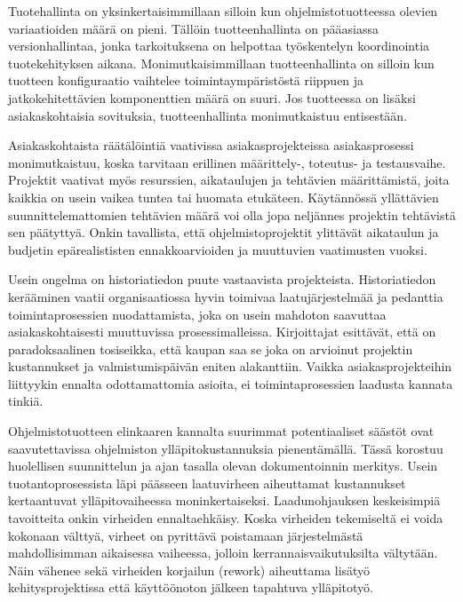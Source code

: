 \documentclass[finnish,12pt,a4paper,pdftex]{article}
\begin{document}
Tuotehallinta on yksinkertaisimmillaan silloin kun ohjelmistotuotteessa olevien variaatioiden määrä on pieni. Tällöin tuotteenhallinta on pääasiassa versionhallintaa, jonka tarkoituksena on helpottaa työskentelyn koordinointia tuotekehityksen aikana. Monimutkaisimmillaan tuotteenhallinta on silloin kun tuotteen konfiguraatio vaihtelee toimintaympäristöstä riippuen ja jatkokehitettävien komponenttien määrä on suuri. Jos tuotteessa on lisäksi asiakaskohtaisia sovituksia, tuotteenhallinta monimutkaistuu entisestään. \citep{okaytannot}

Asiakaskohtaista räätälöintiä vaativissa asiakasprojekteissa asiakasprosessi monimutkaistuu, koska tarvitaan erillinen määrittely-, toteutus- ja testausvaihe. Projektit vaativat myös resurssien, aikataulujen ja tehtävien määrittämistä, joita kaikkia on usein vaikea tuntea tai huomata etukäteen. Käytännössä yllättävien suunnittelemattomien tehtävien määrä voi olla jopa neljännes projektin tehtävistä sen päätyttyä. Onkin tavallista, että ohjelmistoprojektit ylittävät aikataulun ja budjetin epärealististen ennakkoarvioiden ja muuttuvien vaatimusten vuoksi. \citep{okaytannot}

Usein ongelma on historiatiedon puute vastaavista projekteista. Historiatiedon kerääminen vaatii organisaatiossa hyvin toimivaa laatujärjestelmää ja pedanttia toimintaprosessien nuodattamista, joka on usein mahdoton saavuttaa asiakaskohtaisesti muuttuvissa prosessimalleissa. Kirjoittajat esittävät, että on paradoksaalinen tosiseikka, että kaupan saa se joka on arvioinut projektin kustannukset ja valmistumispäivän eniten alakanttiin. Vaikka asiakasprojekteihin liittyykin ennalta odottamattomia asioita, ei toimintaprosessien laadusta kannata tinkiä. \citep{ohjelmistotuotanto, okaytannot}

Ohjelmistotuotteen elinkaaren kannalta suurimmat potentiaaliset säästöt ovat saavutettavissa ohjelmiston ylläpitokustannuksia pienentämällä. Tässä korostuu huolellisen suunnittelun ja ajan tasalla olevan dokumentoinnin merkitys. Usein tuotantoprosessista läpi päässeen laatuvirheen aiheuttamat kustannukset kertaantuvat ylläpitovaiheessa moninkertaiseksi. Laadunohjauksen keskeisimpiä tavoitteita onkin virheiden ennaltaehkäisy. Koska virheiden tekemiseltä ei voida kokonaan välttyä, virheet on pyrittävä poistamaan järjestelmästä mahdollisimman aikaisessa vaiheessa, jolloin kerrannaisvaikutuksilta vältytään. Näin vähenee sekä virheiden korjailun (rework) aiheuttama lisätyö kehitysprojektissa että käyttöönoton jälkeen tapahtuva ylläpitotyö. \citep{ohjelmistotuotanto}
\end{document}
